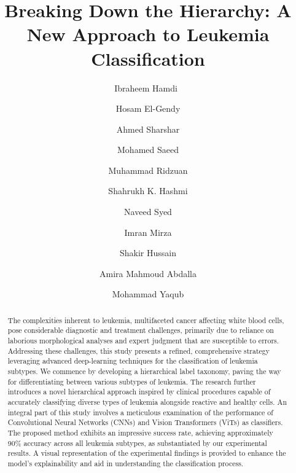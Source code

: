 \documentclass[runningheads]{llncs}
\begin{document}
\title{Breaking Down the Hierarchy: A New Approach to Leukemia Classification} %

\author{Ibraheem Hamdi\ \and
Hosam El-Gendy\and
Ahmed Sharshar \and
Mohamed Saeed \and
Muhammad Ridzuan \and 
Shahrukh K. Hashmi \and
Naveed Syed \and
Imran Mirza \and
Shakir Hussain \and
Amira Mahmoud Abdalla \and
Mohammad Yaqub}



\maketitle             %
%

\begin{abstract}
The complexities inherent to leukemia, multifaceted cancer affecting white blood cells, pose considerable diagnostic and treatment challenges, primarily due to reliance on laborious morphological analyses and expert judgment that are susceptible to errors. Addressing these challenges, this study presents a refined, comprehensive strategy leveraging advanced deep-learning techniques for the classification of leukemia subtypes. We commence by developing a hierarchical label taxonomy, paving the way for differentiating between various subtypes of leukemia. The research further introduces a novel hierarchical approach inspired by clinical procedures capable of accurately classifying diverse types of leukemia alongside reactive and healthy cells. An integral part of this study involves a meticulous examination of the performance of Convolutional Neural Networks (CNNs) and Vision Transformers (ViTs) as classifiers. The proposed method exhibits an impressive success rate, achieving approximately 90\% accuracy across all leukemia subtypes, as substantiated by our experimental results. A visual representation of the experimental findings is provided to enhance the model's explainability and aid in understanding the classification process.
\end{abstract}
\end{document}
